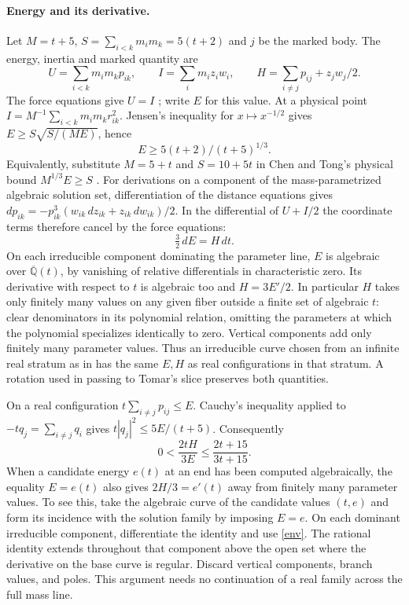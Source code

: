 \documentclass[11pt]{article}
\begin{document}
\paragraph{Energy and its derivative.}
Let $M=t+5$, $S=\sum_{i<k}m_i m_k=5(t+2)$ and $j$ be the marked body. The energy, inertia and marked quantity are
\[
 U=\sum_{i<k}m_i m_kp_{ik},\qquad I=\sum_i m_i z_iw_i,\qquad
 H=\sum_{i\ne j}p_{ij}+z_jw_j/2 .
\]
The force equations give $U=I$ \cite[Lemma 2.3]{Tomar}; write $E$ for this value. At a physical point $I=M^{-1}\sum_{i<k}m_i m_k r_{ik}^2$. Jensen's inequality for $x\mapsto x^{-1/2}$ gives $E\ge S\sqrt{S/(ME)}$, hence
\begin{equation}\label{jensen}
 E\ge 5(t+2)/(t+5)^{1/3}.
\end{equation}
Equivalently, substitute $M=5+t$ and $S=10+5t$ in Chen and Tong's physical bound $M^{1/3}E\ge S$ \cite[proof of Prop.~5.21, following (112)]{CT}.
For derivations on a component of the mass-parametrized algebraic solution set, differentiation of the distance equations gives $dp_{ik}=-p_{ik}^3(w_{ik}\,dz_{ik}+z_{ik}\,dw_{ik})/2$. In the differential of $U+I/2$ the coordinate terms therefore cancel by the force equations:
\begin{equation}\label{env}
 \tfrac32\,dE=H\,dt.
\end{equation}
On each irreducible component dominating the parameter line, $E$ is algebraic over $\overline{\mathbb Q}(t)$, by vanishing of relative differentials in characteristic zero. Its derivative with respect to $t$ is algebraic too and $H=3E'/2$. In particular $H$ takes only finitely many values on any given fiber outside a finite set of algebraic $t$: clear denominators in its polynomial relation, omitting the parameters at which the polynomial specializes identically to zero. Vertical components add only finitely many parameter values. Thus an irreducible curve chosen from an infinite real stratum as in \cite{Prior} has the same $E,H$ as real configurations in that stratum. A rotation used in passing to Tomar's slice preserves both quantities.

On a real configuration $t\sum_{i\ne j}p_{ij}\le E$. Cauchy's inequality applied to $-tq_j=\sum_{i\ne j}q_i$ gives $t|q_j|^2\le5E/(t+5)$. Consequently
\begin{equation}\label{elastic}
 0<\frac{2tH}{3E}\le\frac{2t+15}{3t+15}.
\end{equation}
When a candidate energy $e(t)$ at an end has been computed algebraically, the equality $E=e(t)$ also gives $2H/3=e'(t)$ away from finitely many parameter values. To see this, take the algebraic curve of the candidate values $(t,e)$ and form its incidence with the solution family by imposing $E=e$. On each dominant irreducible component, differentiate the identity and use \eqref{env}. The rational identity extends throughout that component above the open set where the derivative on the base curve is regular. Discard vertical components, branch values, and poles. This argument needs no continuation of a real family across the full mass line.
\end{document}
